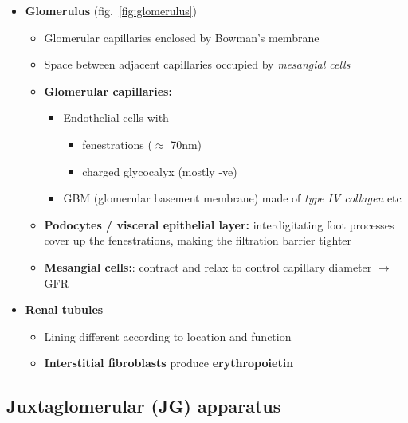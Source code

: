\documentclass[
  12pt,
]{memoir}
\providecommand{\tightlist}{%
  \setlength{\itemsep}{0pt}\setlength{\parskip}{0pt}}
\begin{document}
\begin{itemize}
\tightlist
\item
  \textbf{Glomerulus} (fig.~\ref{fig:glomerulus})

  \begin{itemize}
  \tightlist
  \item
    Glomerular capillaries enclosed by Bowman's membrane
  \item
    Space between adjacent capillaries occupied by \emph{mesangial
    cells}
  \item
    \textbf{Glomerular capillaries:}

    \begin{itemize}
    \tightlist
    \item
      Endothelial cells with

      \begin{itemize}
      \tightlist
      \item
        fenestrations (\(\approx\) 70nm)
      \item
        charged glycocalyx (mostly -ve)
      \end{itemize}
    \item
      GBM (glomerular basement membrane) made of \emph{type IV collagen}
      etc
    \end{itemize}
  \item
    \textbf{Podocytes / visceral epithelial layer:} interdigitating foot
    processes cover up the fenestrations, making the filtration barrier
    tighter
  \item
    \textbf{Mesangial cells:}: contract and relax to control capillary
    diameter \(\rightarrow\) GFR
  \end{itemize}
\item
  \textbf{Renal tubules}

  \begin{itemize}
  \tightlist
  \item
    Lining different according to location and function
  \item
    \textbf{Interstitial fibroblasts} produce \textbf{erythropoietin}
  \end{itemize}
\end{itemize}

\hypertarget{juxtaglomerular-jg-apparatus}{%
\subsection{Juxtaglomerular (JG)
apparatus}\label{juxtaglomerular-jg-apparatus}}
\end{document}
